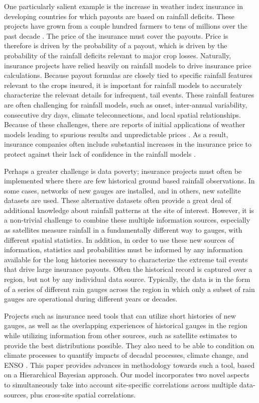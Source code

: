 \documentclass[11pt]{article}
\begin{document}
One particularly salient example is the increase in weather index insurance in developing countries for which payouts are based on rainfall deficits.  These projects have grown from a couple hundred farmers to tens of millions over the past decade \cite{Greatrex2015}.   The price of the insurance must cover the payouts.  Price is therefore is driven by the probability of a payout, which is driven by the probability of the rainfall deficits relevant to major crop losses. Naturally, insurance projects have relied heavily on rainfall models to drive insurance price calculations.  Because payout formulas are closely tied to specific rainfall features relevant to the crops insured, it is important for rainfall models to accurately characterize the relevant details for infrequent, tail events.  These rainfall features are often challenging for rainfall models, such as onset, inter-annual variability, consecutive dry days, climate teleconnections, and local spatial relationships. Because of these challenges, there are reports of initial applications of weather models leading to spurious results and unpredictable prices \cite{Giannini2009}.  As a result, insurance companies often include substantial increases in the insurance price to protect against their lack of confidence in the rainfall models \cite{Osgood2012}.

Perhaps a greater challenge is data poverty;  insurance projects must often be implemented where there are few historical ground based rainfall observations.  In some cases, networks of new gauges are installed, and in others, new satellite datasets are used.  These alternative datasets often provide a great deal of additional knowledge about rainfall patterns at the site of interest.  However, it is a non-trivial challenge to combine these multiple information sources, especially as satellites measure rainfall in a fundamentally different way to gauges, with different spatial statistics.  In addition, in order to use these new sources of information, statistics and probabilities must be informed by any information available for the long histories necessary to characterize the extreme tail events that drive large insurance payouts. Often the historical record is captured over a region, but not by any individual data source.  Typically, the data is in the form of a series of different rain gauges across the region in which only a subset of rain gauges are operational during different years or decades.

Projects such as insurance need tools that can utilize short histories of new gauges, as well as the overlapping experiences of historical gauges in the region while utilizing information from other sources, such as satellite estimates to provide the best distributions possible.  They also need to be able to condition on climate processes to quantify impacts of decadal processes, climate change, and ENSO \cite{Bell2013}.   This paper provides advances in methodology towards such a tool, based on a Hierarchical Bayesian approach.  Our model incorporates two novel aspects to simultaneously take into account site-specific correlations across multiple data-sources, plus cross-site spatial correlations.
\end{document}
